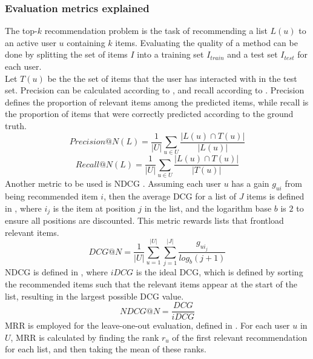 \subsubsection*{Evaluation metrics explained}
The top-$k$ recommendation problem is the task of recommending a list $L(u)$ to an active user $u$ containing $k$ items.
Evaluating the quality of a method can be done by splitting the set of items $I$ into a training set $I_{train}$ and a test set $I_{test}$ for each user.
\\
Let $T(u)$ be the the set of items that the user has interacted with in the test set.
Precision can be calculated according to , and recall according to .
Precision defines the proportion of relevant items among the predicted items, while recall is the proportion of items that were correctly predicted according to the ground truth.
\begin{equation}
    \label{eqn:precision}
    Precision@N(L) = \frac{1}{|U|} \sum\limits_{u \in U}\frac{|L(u) \cap T(u)|}{|L(u)|}
\end{equation}
\begin{equation}
    \label{eqn:recall}
    Recall@N(L) = \frac{1}{|U|} \sum\limits_{u \in U} \frac{|L(u) \cap T(u)|}{|T(u)|}
\end{equation}
Another metric to be used is NDCG \cite{dcgpaper}.
Assuming each user $u$ has a gain $g_{ui}$ from being recommended item $i$, then the average DCG for a list of $J$ items is defined in , where $i_j$ is the item at position $j$ in the list, and the logarithm base $b$ is $2$ to ensure all positions are discounted.
This metric rewards lists that frontload relevant items.
\begin{equation}
    \label{eqn:dcg}
    DCG@N = \frac{1}{|U|} \sum\limits_{u=1}^{|U|} \sum\limits_{j = 1}^{|J|} \frac{g_{ui_j}}{log_b (j+1)}
\end{equation}
NDCG is defined in , where $iDCG$ is the ideal DCG, which is defined by sorting the recommended items such that the relevant items appear at the start of the list, resulting in the largest possible DCG value.
\begin{equation}
    \label{eqn:ndcg}
    NDCG@N = \frac{DCG}{iDCG}
\end{equation}
MRR \cite{MRR} is employed for the leave-one-out evaluation, defined in .
For each user $u$ in $U$, MRR is calculated by finding the rank $r_u$ of the first relevant recommendation for each list, and then taking the mean of these ranks.

